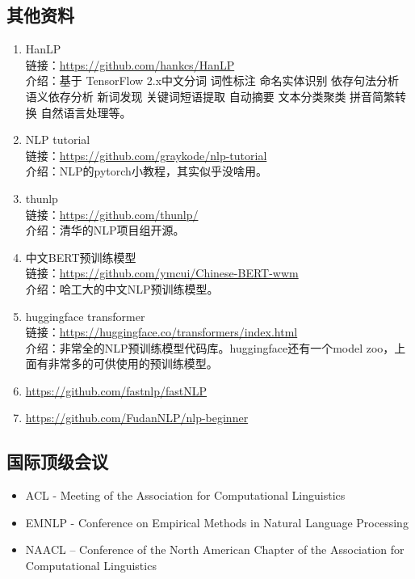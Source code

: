 \documentclass[lang=cn,11pt,a4paper]{eleganttemplate}
\begin{document}
\subsection{其他资料}
\begin{enumerate}
    \item HanLP\\
    链接：\href{https://github.com/hankcs/HanLP}{https://github.com/hankcs/HanLP}  \\
    介绍：基于 TensorFlow 2.x中文分词 词性标注 命名实体识别 依存句法分析 语义依存分析 新词发现 关键词短语提取 自动摘要 文本分类聚类 拼音简繁转换 自然语言处理等。
    \item NLP tutorial \\
    链接：\href{https://github.com/graykode/nlp-tutorial}{https://github.com/graykode/nlp-tutorial}  \\
    介绍：NLP的pytorch小教程，其实似乎没啥用。
    \item thunlp \\
    链接：\href{https://github.com/thunlp/}{https://github.com/thunlp/}  \\
    介绍：清华的NLP项目组开源。 
    \item 中文BERT预训练模型 \\
    链接：\href{https://github.com/ymcui/Chinese-BERT-wwm}{https://github.com/ymcui/Chinese-BERT-wwm}  \\
    介绍：哈工大的中文NLP预训练模型。
    \item huggingface transformer \\
    链接：\href{https://huggingface.co/transformers/index.html}{https://huggingface.co/transformers/index.html}  \\
    介绍：非常全的NLP预训练模型代码库。huggingface还有一个model zoo，上面有非常多的可供使用的预训练模型。
	\item \href{https://github.com/fastnlp/fastNLP}{https://github.com/fastnlp/fastNLP} 
    \item \href{https://github.com/FudanNLP/nlp-beginner}{https://github.com/FudanNLP/nlp-beginner}
\end{enumerate}

\subsection{国际顶级会议}
\begin{itemize}
    \item ACL - Meeting of the Association for Computational Linguistics
    \item EMNLP - Conference on Empirical Methods in Natural Language Processing
    \item NAACL – Conference of the North American Chapter of the Association for Computational Linguistics
\end{itemize}
\end{document}
